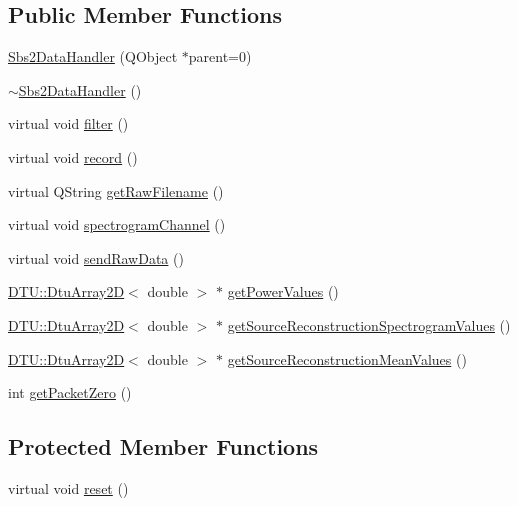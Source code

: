 \subsection*{Public Member Functions}
\begin{DoxyCompactItemize}
\item 
\hyperlink{classSbs2DataHandler_a7ba4fb90e961ec8ff8958b271a6e746c}{Sbs2\-Data\-Handler} (Q\-Object $\ast$parent=0)
\item 
\hyperlink{classSbs2DataHandler_aaa08ce6949d3a979b9048fcdc280728e}{$\sim$\-Sbs2\-Data\-Handler} ()
\item 
virtual void \hyperlink{classSbs2DataHandler_adc6eccfe43b0759c5d4bc248b289e670}{filter} ()
\item 
virtual void \hyperlink{classSbs2DataHandler_a06ec994f323602e812cb548e6d78fddd}{record} ()
\item 
virtual Q\-String \hyperlink{classSbs2DataHandler_a4f429e3eab9329e386004e581eed5169}{get\-Raw\-Filename} ()
\item 
virtual void \hyperlink{classSbs2DataHandler_a97bb167202da122efccbce7566178645}{spectrogram\-Channel} ()
\item 
virtual void \hyperlink{classSbs2DataHandler_a523f8b5ffae2d11005196e4f7b39d1c5}{send\-Raw\-Data} ()
\item 
\hyperlink{classDTU_1_1DtuArray2D}{D\-T\-U\-::\-Dtu\-Array2\-D}$<$ double $>$ $\ast$ \hyperlink{classSbs2DataHandler_ace19ab4328535ed1929417d7079047ad}{get\-Power\-Values} ()
\item 
\hyperlink{classDTU_1_1DtuArray2D}{D\-T\-U\-::\-Dtu\-Array2\-D}$<$ double $>$ $\ast$ \hyperlink{classSbs2DataHandler_a3f9fda7e1bb37574752d79ff4507cfcd}{get\-Source\-Reconstruction\-Spectrogram\-Values} ()
\item 
\hyperlink{classDTU_1_1DtuArray2D}{D\-T\-U\-::\-Dtu\-Array2\-D}$<$ double $>$ $\ast$ \hyperlink{classSbs2DataHandler_a48501124932c256d9f2770b4fa50fc81}{get\-Source\-Reconstruction\-Mean\-Values} ()
\item 
int \hyperlink{classSbs2DataHandler_afd9db04705b6f39a7ee51db969929aaa}{get\-Packet\-Zero} ()
\end{DoxyCompactItemize}
\subsection*{Protected Member Functions}
\begin{DoxyCompactItemize}
\item 
virtual void \hyperlink{classSbs2DataHandler_a065dfd6e24bca97f2ca0958911b06f96}{reset} ()
\end{DoxyCompactItemize}
